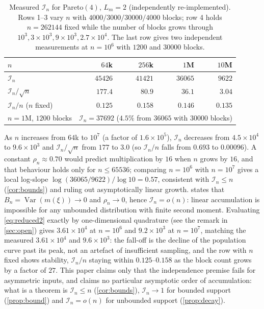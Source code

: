 \documentclass[review,hidelinks,oneeqnum,onetabnum,onefignum,onethmnum]{siamart251216}
\begin{document}
\begin{table}[!tb]
\centering
\caption{Measured $\mathcal I_n$ for Pareto$(4)$, $L_m=2$ (independently
re-implemented). Rows 1--3 vary $n$ with $4000/3000/30000/4000$ blocks; row 4
holds $n=262144$ fixed while the number of blocks grows through
$10^3,3\times10^3,9\times10^3,2.7\times10^4$. The last row gives two independent
measurements at $n=10^6$ with $1200$ and $30000$ blocks.}
\label{tab:bign}
\small
\begin{tabular}{@{}lrrrr@{}}
\toprule
$n$ & $64$k & $256$k & $1$M & $10$M \\
\midrule
$\mathcal I_n$ & $45426$ & $41421$ & $36065$ & $9622$ \\
$\mathcal I_n/\sqrt n$ & $177.4$ & $80.9$ & $36.1$ & $3.04$ \\
$\mathcal I_n/n$ ($n$ fixed) & $0.125$ & $0.158$ & $0.146$ & $0.135$ \\
\midrule
$n=1$M, $1200$ blocks & \multicolumn{4}{c}{$\mathcal I_n=37692$ ($4.5\%$ from $36065$ with $30000$ blocks)} \\
\bottomrule
\end{tabular}
\end{table}

As $n$ increases from $64$k to $10^7$ (a factor of $1.6\times10^5$), $\mathcal I_n$
decreases from $4.5\times10^4$ to $9.6\times10^3$ and $\mathcal I_n/\sqrt n$ from
$177$ to $3.0$ (so $\mathcal I_n/n$ falls from $0.693$ to $0.00096$). A constant
$\rho_n\approx0.70$ would predict multiplication by $16$ when $n$ grows by $16$,
and that behaviour holds only for $n\le65536$; comparing $n=10^6$ with $n=10^7$
gives a local log-slope $\log(36065/9622)/\log 10=0.57$, consistent with
$\mathcal I_n\le n$ (\cref{cor:bounds}) and ruling out asymptotically linear
growth.  states that $B_n=\operatorname{Var}(m(\xi))\to0$ and
$\rho_n\to0$, hence $\mathcal I_n=o(n)$: linear accumulation is impossible for any
unbounded distribution with finite second moment. Evaluating \cref{eq:reduced2}
exactly by one-dimensional quadrature (see the remark in \cref{sec:open}) gives
$3.61\times10^4$ at $n=10^6$ and $9.2\times10^3$ at $n=10^7$, matching the measured
$3.61\times10^4$ and $9.6\times10^3$: the fall-off is the decline of the population
curve past its peak, not an artefact of insufficient sampling, and the row with $n$
fixed shows stability, $\mathcal I_n/n$ staying within $0.125$--$0.158$ as the
block count grows by a factor of $27$. This paper claims only that the independence
premise fails for asymmetric inputs, and claims no particular asymptotic order of
accumulation: what is a theorem is $\mathcal I_n\le n$ (\cref{cor:bounds}),
$\mathcal I_n\to1$ for bounded support (\cref{prop:bound}) and $\mathcal I_n=o(n)$
for unbounded support (\cref{prop:decay}).
\end{document}
